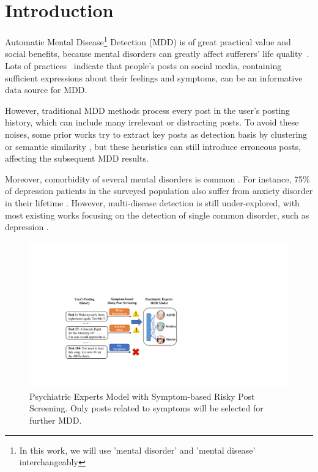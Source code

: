 \section{Introduction}
\label{sec:intro}

Automatic Mental Disease\footnote{In this work, we will use 'mental disorder' and 'mental disease' interchangeably} Detection (MDD) is of great practical value and social benefits, because mental disorders can greatly affect sufferers' life quality~\citep{Dreisbach2019systematic}. 
Lots of practices~\citep{coppersmith2015adhd,mowery2017understanding} indicate that people's posts on social media, containing sufficient expressions about their feelings and symptoms, can be an informative data source for MDD. 

However, traditional MDD methods \cite{yates2017depression, trotzek2018utilizing} process every post in the user's posting history, which can include many irrelevant or distracting posts. 
To avoid these noises, some prior works try to extract key posts as detection basis by clustering \cite{zogan2021depressionnet} or semantic similarity \cite{zhang2022psychiatric}, but these heuristics can still introduce erroneous posts, affecting the subsequent MDD results. 

Moreover, comorbidity of several mental disorders is common \cite{ROCA2009Prevalence}. 
For instance, 75\% of depression patients in the surveyed population also suffer from anxiety disorder in their lifetime \cite{Femke2011Comorbidity}. 
However, multi-disease detection is still under-explored, with most existing works focusing on the detection of single common disorder, such as depression \citep{losada2017erisk, lee2021micromodels}. 

\begin{figure}[t]
    \centering
    \includegraphics[width=1.0\columnwidth]{figures/pipeline.pdf}
    \caption{Psychiatric Experts Model with Symptom-based Risky Post Screening. Only posts related to symptoms will be selected for further MDD.}
    \label{fig:pipeline}
\end{figure}


